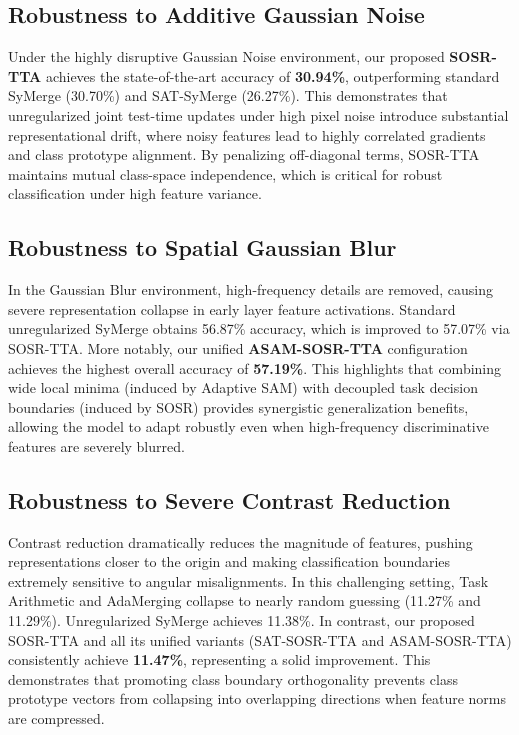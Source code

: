 \documentclass{article}
\theoremstyle{plain}
\theoremstyle{definition}
\theoremstyle{remark}
\begin{document}
\subsection{Robustness to Additive Gaussian Noise}
Under the highly disruptive Gaussian Noise environment, our proposed \textbf{SOSR-TTA} achieves the state-of-the-art accuracy of \textbf{30.94\%}, outperforming standard SyMerge (30.70\%) and SAT-SyMerge (26.27\%). This demonstrates that unregularized joint test-time updates under high pixel noise introduce substantial representational drift, where noisy features lead to highly correlated gradients and class prototype alignment. By penalizing off-diagonal terms, SOSR-TTA maintains mutual class-space independence, which is critical for robust classification under high feature variance.

\subsection{Robustness to Spatial Gaussian Blur}
In the Gaussian Blur environment, high-frequency details are removed, causing severe representation collapse in early layer feature activations. Standard unregularized SyMerge obtains 56.87\% accuracy, which is improved to 57.07\% via SOSR-TTA. More notably, our unified \textbf{ASAM-SOSR-TTA} configuration achieves the highest overall accuracy of \textbf{57.19\%}. This highlights that combining wide local minima (induced by Adaptive SAM) with decoupled task decision boundaries (induced by SOSR) provides synergistic generalization benefits, allowing the model to adapt robustly even when high-frequency discriminative features are severely blurred.

\subsection{Robustness to Severe Contrast Reduction}
Contrast reduction dramatically reduces the magnitude of features, pushing representations closer to the origin and making classification boundaries extremely sensitive to angular misalignments. In this challenging setting, Task Arithmetic and AdaMerging collapse to nearly random guessing (11.27\% and 11.29\%). Unregularized SyMerge achieves 11.38\%. In contrast, our proposed SOSR-TTA and all its unified variants (SAT-SOSR-TTA and ASAM-SOSR-TTA) consistently achieve \textbf{11.47\%}, representing a solid improvement. This demonstrates that promoting class boundary orthogonality prevents class prototype vectors from collapsing into overlapping directions when feature norms are compressed.
\end{document}
